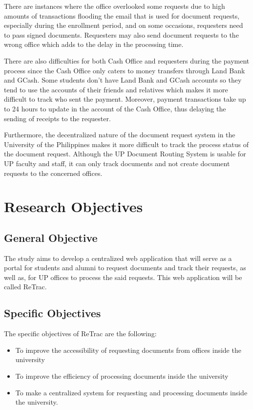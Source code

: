 There are instances where the office overlooked some requests due to high amounts of transactions flooding the email that is used for document requests, especially during the enrollment period, and on some occasions, requesters need to pass signed documents. Requesters may also send document requests to the wrong office which adds to the delay in the processing time.

There are also difficulties for both Cash Office and requesters during the payment process since the Cash Office only caters to money transfers through Land Bank and GCash. Some students don't have Land Bank and GCash accounts so they tend to use the accounts of their friends and relatives which makes it more difficult to track who sent the payment. Moreover, payment transactions take up to 24 hours to update in the account of the Cash Office, thus delaying the sending of receipts to the requester.

Furthermore, the decentralized nature of the document request system in the University of the Philippines makes it more difficult to track the process status of the document request. Although the UP Document Routing System is usable for UP faculty and staff, it can only track documents and not create document requests to the concerned offices.


\section{Research Objectives}
\label{sec:researchobjectives}

\subsection{General Objective}
\label{sec:generalobjective}

The study aims to develop a centralized web application that will serve as a portal for students and alumni to request documents and track their requests, as well as, for UP offices to process the said requests. This web application will be called ReTrac.


\subsection{Specific Objectives}
\label{sec:specificobjectives}


The specific objectives of ReTrac are the following:
\begin{itemize}
    \item To improve the accessibility of requesting documents from offices inside the university
    \item To improve the efficiency of processing documents inside the university
    \item To make a centralized system for requesting and processing documents inside the university.
    \vfill
\end{itemize}


